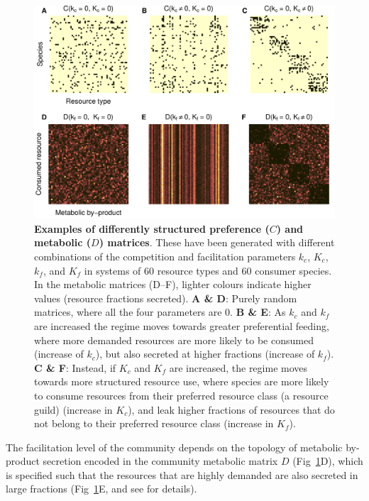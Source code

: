 \documentclass[10pt,letterpaper]{article}
\begin{document}
\begin{figure}[t]
\begin{adjustwidth}{-1.5in}{0in}
	\centering
	\includegraphics[width=1.2\columnwidth]{sampling_scenarios.pdf}
	\caption{\textbf{Examples of differently structured preference ($C$) and metabolic ($D$) matrices}. These have been generated with different combinations of the competition and facilitation parameters $k_c$, $K_c$, $k_f$, and $K_f$ in systems of 60 resource types and 60 consumer species. In the metabolic matrices (D--F), lighter colours indicate higher values (resource fractions secreted). {\bf A \& D}: Purely random matrices, where  all the four parameters are 0. {\bf B \& E}: As $k_c$ and $k_f$ are increased the regime moves towards greater preferential feeding, where more demanded resources are more likely to be consumed (increase of $k_c$), but also secreted at higher fractions (increase of $k_f$). {\bf C \& F}: Instead, if $K_c$ and $K_f$ are increased, the regime moves towards more structured resource use, where species are more likely to consume resources from their preferred resource class (a resource guild) (increase in $K_c$), and leak higher fractions of resources that do not belong to their preferred resource class (increase in $K_f$).}
	\label{fig:three_sampling_scenarios}
\end{adjustwidth}
\end{figure}

The facilitation level of the community depends on the topology of metabolic by-product secretion encoded in the community metabolic matrix $ D $ (Fig~\ref{fig:three_sampling_scenarios}D), which is specified such that the resources that are highly demanded are also secreted in large fractions  (Fig~\ref{fig:three_sampling_scenarios}E, and see  for details).\\
\end{document}

